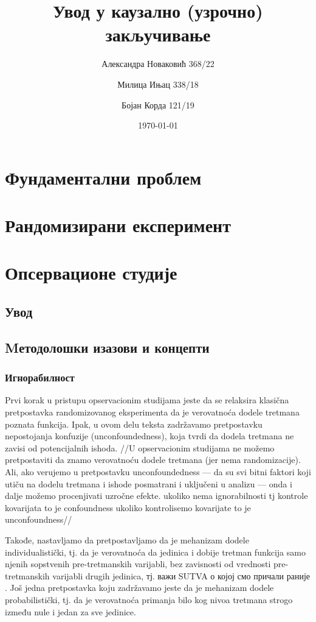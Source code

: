 \documentclass[12pt, a4paper]{article}
\title{Увод у каузално (узрочно) закључивање}
\author{Александра Новаковић 368/22}
\author{Милица Ињац 338/18}
\author{Бојан Корда 121/19}
\affil{Математички факултет, Универзитет у Београду}
\date{\today}
\begin{document}
\maketitle
\newpage

\tableofcontents
\newpage

\section{Фундаментални проблем}
\newpage



\section{Рандомизирани експеримент}
\newpage



\section{Опсервационе студије}

\subsection{Увод}


\subsection{Mетодолошки изазови и концепти}
\subsubsection{Игнорабилност}
Prvi korak u pristupu opservacionim studijama jeste da se relaksira klasična pretpostavka randomizovanog eksperimenta da je verovatnoća dodele tretmana poznata funkcija. Ipak, u ovom delu teksta zadržavamo pretpostavku nepostojanja konfuzije (unconfoundedness), koja tvrdi da dodela tretmana ne zavisi od potencijalnih ishoda.
 //U opservacionim studijama ne možemo pretpostaviti da znamo verovatnoću dodele tretmana (jer nema randomizacije). Ali, ako verujemo u pretpostavku unconfoundedness — da su svi bitni faktori koji utiču na dodelu tretmana i ishode posmatrani i uključeni u analizu — onda i dalje možemo procenjivati uzročne efekte.
ukoliko nema ignorabilnosti tj kontrole kovarijata to je confoundness
ukoliko kontrolisemo kovarijate to je unconfoundness//

Takođe, nastavljamo da pretpostavljamo da je mehanizam dodele individualistički, tj. da je verovatnoća da jedinica i dobije tretman funkcija samo njenih sopstvenih pre-tretmanskih varijabli, bez zavisnosti od vrednosti pre-tretmanskih varijabli drugih jedinica, тј. важи SUTVA о којој смо причали раније . Još jedna pretpostavka koju zadržavamo jeste da je mehanizam dodele probabilistički, tj. da je verovatnoća primanja bilo kog nivoa tretmana strogo između nule i jedan za sve jedinice.
\end{document}
